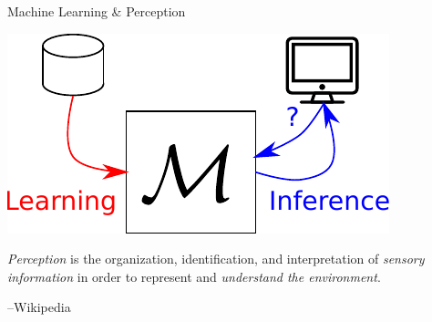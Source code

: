\documentclass{beamer}
\begin{document}
\begin{frame}{Machine Learning \& Perception}
    \vfill

    \centering
    \begin{minipage}{0.33\textwidth}
        \includegraphics[width=\columnwidth]{machinelearning.pdf}
    \end{minipage}
    \hfill
    \begin{minipage}{0.65\textwidth}
        \raggedright
        \emph{Perception} is the organization, identification, and
        interpretation of \emph{sensory information} in order to
        represent and \emph{understand the environment}.
        
        \raggedleft
        {\scriptsize --Wikipedia}
    \end{minipage}


\end{frame}
\end{document}
